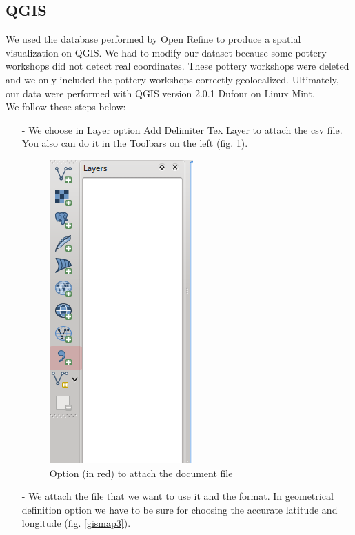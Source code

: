 \documentclass[10pt,a4paper]{article}
\begin{document}
\subsection{QGIS}

We used the database performed by Open Refine to produce a spatial visualization on QGIS. We had to modify our dataset because some pottery workshops did not detect real coordinates. These pottery workshops were deleted and we only included the pottery workshops correctly geolocalized. Ultimately, our data were performed with QGIS version 2.0.1 Dufour on Linux Mint. 
\\

We follow these steps below:
\begin{itemize}
\item[-] We choose in Layer option Add Delimiter Tex Layer to attach the csv file. You also can do it in the Toolbars on the left (fig. \ref{gismap2}).
\begin{figure}[htp]
\centering
\includegraphics[scale=0.40]{gismap2.png}
\caption{Option (in red) to attach the document file}
\label{gismap2}
\end{figure}
\item[-] We attach the file that we want to use it and the format. In geometrical definition option we have to be sure for choosing the accurate latitude and longitude (fig. \ref{gismap3}).


\end{itemize}
\end{document}
